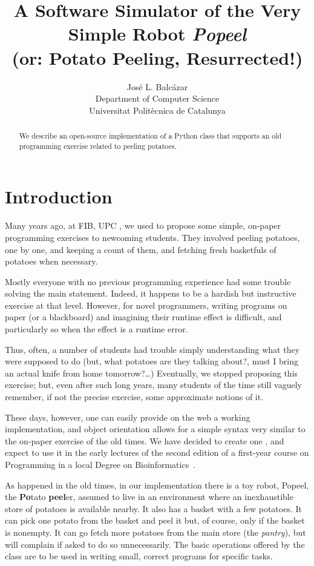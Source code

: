 \documentclass[12pt]{article}
\title{A Software Simulator of the Very Simple Robot \emph{Popeel}%
\\ \medskip\Large
(or: Potato Peeling, Resurrected!)
}
\author{Jos\'e L. Balc\'azar \\
{Department of Computer Science} \\
{Universitat Polit\`ecnica de Catalunya}}
\begin{document}
\maketitle

\begin{abstract}
We describe an open-source implementation of a
Python class that supports an old programming
exercise related to peeling potatoes.
\end{abstract}


\section{Introduction}%

Many years ago, at FIB, UPC \cite{FIB}, we used to 
propose some simple, on-paper programming exercises 
to newcoming students. They involved peeling potatoes, 
one by one, and keeping a count of them, and fetching 
fresh basketfuls of potatoes when necessary. 

Mostly everyone with no previous programming 
experience had some trouble solving the main
statement. Indeed, it happens to be a hardish but 
instructive exercise at that level. However, 
for novel programmers, writing programs on paper 
(or a blackboard) and imagining their runtime effect 
is difficult, and particularly so when the effect 
is a runtime error.

Thus, often, a number of students had trouble simply understanding 
what they were supposed to do \cite{PBblog} (but, what 
potatoes are they talking about?, must I bring an actual 
knife from home tomorrow?\dots) Eventually, we stopped 
proposing this exercise; but, even after such long years,
many students of the time still vaguely remember, 
if not the precise exercise, some approximate
notions of it.

These days, however, one can easily provide on the 
web a working implementation, and object orientation
allows for a simple syntax very similar to the 
on-paper exercise of the old times. We have decided
to create one \cite{Popeel}, and expect to use it in the early
lectures of the second edition of a first-year
course on Programming \cite{mireport} in a local 
Degree on Bioinformatics~\cite{BDBI}.

As happened in the old times, in our implementation
there is a toy robot, Popeel, the 
{\bf Po}tato {\bf peel}er, assumed to live in an 
environment where an inexhaustible store of potatoes 
is available nearby. It also has a basket with a few 
potatoes. It can pick one potato from the basket and 
peel it but, of course, only if the basket is nonempty. It can go 
fetch more potatoes from the main store (the \emph{pantry}), 
but will complain 
if asked to do so unnecessarily. The basic operations
offered by the class are to be used in writing small,
correct programs for specific tasks.
\end{document}
